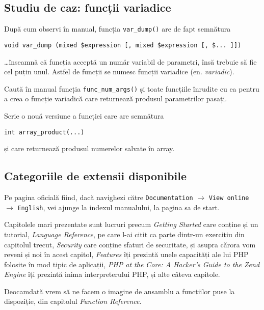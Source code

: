 \subsection{Studiu de caz: funcții variadice}
După cum observi în manual, funcția \texttt{var\_dump()}
are de fapt semnătura
\begin{verbatim}
void var_dump (mixed $expression [, mixed $expression [, $... ]])
\end{verbatim}
\ldots înseamnă că funcția acceptă un număr variabil
de parametri, însă trebuie să fie cel puțin unul.
Astfel de funcții se numesc funcții variadice (en. \textsl{variadic}).

\begin{Exercise}[title={Crează o funcție variadică}]
\ExePart
Caută în manual funcția \texttt{func\_num\_args()} și
toate funcțiile înrudite cu ea pentru a crea
o funcție variadică care returnează produsul parametrilor
pasați.

\ExePart
Scrie o nouă versiune a funcției care are semnătura
\begin{verbatim}
int array_product(...)
\end{verbatim}
și care returnează produsul numerelor salvate în array.

% 
\end{Exercise}


\subsection{Categoriile de extensii disponibile}
Pe pagina oficială fiind, dacă navighezi către
\texttt{Documentation} $\rightarrow$ \texttt{View online}
$\rightarrow$ \texttt{English},
vei ajunge la indexul
manualului, la pagina sa de start.

Capitolele mari prezentate sunt lucruri precum
\textit{Getting Started} care conține și un tutorial,
\textit{Language Reference}, pe care l-ai
citit ca parte dintr-un exercițiu din capitolul trecut,
\textit{Security} care conține sfaturi de securitate,
și asupra cărora vom reveni și noi
în acest capitol, \textit{Features} îți prezintă
unele capacități ale lui PHP folosite
în mod tipic de aplicații, \textit{PHP at the Core: A Hacker's Guide to the Zend Engine}
îți prezintă inima interpreterului PHP, și alte câteva capitole.

Deocamdată vrem să ne facem o imagine de ansamblu a funcțiilor
puse la dispoziție, din capitolul \textit{Function Reference}.

